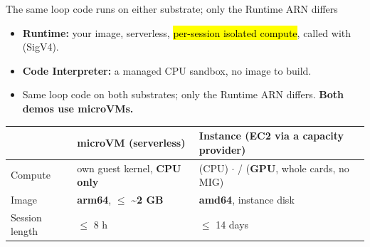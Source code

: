 \begin{frame}{The same loop code runs on either substrate; only the Runtime ARN differs}
\begin{itemize}\footnotesize\setlength{\itemsep}{1mm}
\item \textbf{Runtime:} your image, serverless, \hl{per-session isolated compute}, called with  (SigV4).
\item \textbf{Code Interpreter:} a managed CPU sandbox, no image to build.
\item Same loop code on both substrates; only the Runtime ARN differs. \textbf{Both demos use microVMs.}
\end{itemize}
\vspace{2mm}
\footnotesize
\begin{tabularx}{\textwidth}{@{}l Y Y@{}}
\toprule
 & \textbf{microVM} (serverless) & \textbf{Instance} (EC2 via a capacity provider)\\
\midrule
Compute & own guest kernel, \textbf{CPU only} &  (CPU) $\cdot$  /  (\textbf{GPU}, whole cards, no MIG)\\
Image & \textbf{arm64}, $\le$ \textasciitilde\textbf{2 GB} & \textbf{amd64}, instance disk\\
Session length & $\le$ 8 h & $\le$ 14 days\\
\bottomrule
\end{tabularx}
\end{frame}

